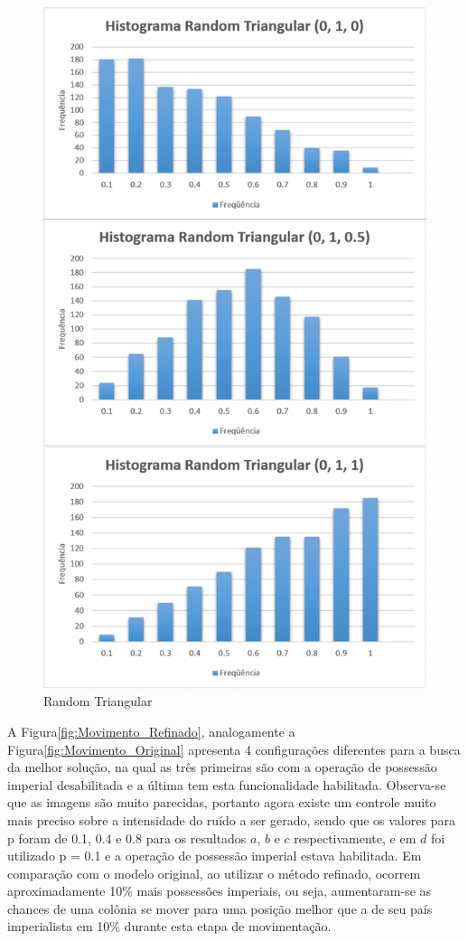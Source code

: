 \begin{figure}[H]
	\centering
	\includegraphics[scale=0.55]{Figuras/RandomTriangular-White.png}
	\caption{Random Triangular}
	\label{fig:RandomTriangular-White}
\end{figure}

A Figura\ref{fig:Movimento_Refinado}, analogamente a Figura\ref{fig:Movimento_Original}  apresenta 4 configurações diferentes para a busca da melhor solução, na qual as três primeiras são com a operação de possessão imperial desabilitada e a última tem esta funcionalidade habilitada. Observa-se que as imagens são muito parecidas, portanto agora existe um controle muito mais preciso sobre a intensidade  do ruído a ser gerado, sendo que os valores para p foram de 0.1, 0.4 e 0.8 para os resultados \(a\), \(b\) e \(c\) respectivamente, e em \(d\) foi utilizado p = 0.1 e a operação de possessão imperial estava habilitada. Em comparação com o modelo original, ao utilizar o método refinado, ocorrem aproximadamente 10\% mais possessões imperiais, ou seja, aumentaram-se as chances de uma colônia se mover para uma posição melhor que a de seu país imperialista em 10\% durante esta etapa de movimentação.

